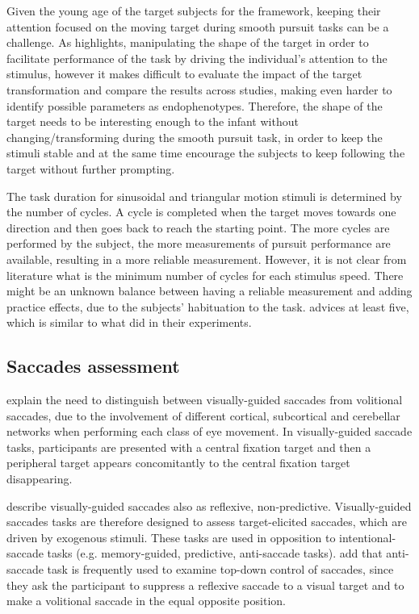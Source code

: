 Given the young age of the target subjects for the framework, keeping their attention focused on the moving target during smooth pursuit tasks can be a challenge. As \cite{smyrnis2008guidelines} highlights, manipulating the shape of the target in order to facilitate performance of the task by driving the individual’s attention to the stimulus, however it makes difficult to evaluate the impact of the target transformation and compare the results across studies, making even harder to identify possible parameters as endophenotypes. Therefore, the shape of the target needs to be interesting enough to the infant without changing/transforming during the smooth pursuit task, in order to keep the stimuli stable and at the same time encourage the subjects to keep following the target without further prompting.

The task duration for sinusoidal and triangular motion stimuli is determined by the number of cycles. A cycle is completed when the target moves towards one direction and then goes back to reach the starting point. The more cycles are performed by the subject, the more measurements of pursuit performance are available, resulting in a more reliable measurement. However, it is not clear from literature what is the minimum number of cycles for each stimulus speed. There might be an unknown balance between having a reliable measurement and adding practice effects, due to the subjects’ habituation to the task. \cite{smyrnis2008guidelines} advices at least five, which is similar to what  \cite{vonhofsten1997smoothpursuit} did in their experiments.



\subsection{Saccades assessment}
\label{sec:fwksaccades}

\cite{johnson2016review} explain the need to distinguish between visually-guided saccades from volitional saccades, due to the involvement of different cortical, subcortical and cerebellar networks when performing each class of eye movement. In visually-guided saccade tasks, participants are presented with a central fixation target and then a peripheral target appears concomitantly to the central fixation target disappearing.

\cite{brenner2007visualsearch} describe visually-guided saccades also as reflexive, non-predictive. Visually-guided saccades tasks are therefore designed to assess target-elicited saccades, which are driven by exogenous stimuli. These tasks are used in opposition to intentional-saccade tasks (e.g. memory-guided, predictive, anti-saccade tasks). \cite{johnson2016review} add that anti-saccade task is frequently used to examine top-down control of saccades, since they ask the participant to suppress a reflexive saccade to a visual target and to make a volitional saccade in the equal opposite position.

